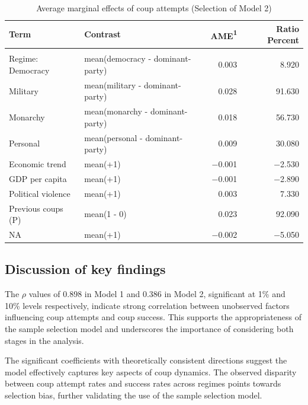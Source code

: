 \documentclass[
  12pt,
]{report}
\begin{document}
\begin{longtable}[]{@{}llrr@{}}

\caption{\label{tbl-mfx2}Average marginal effects of coup attempts
(Selection of Model 2)}

\tabularnewline

\toprule\noalign{}
Term & Contrast & AME{\textsuperscript{1}} & Ratio Percent \\
\midrule\noalign{}
\endhead
\midrule\noalign{}
\multicolumn{4}{@{}l@{}}{%
{\textsuperscript{1}} AME: Average Marginal Effect} \\
\bottomrule\noalign{}
\endlastfoot
Regime: Democracy & mean(democracy - dominant-party) & 0.003 & 8.920 \\
Military & mean(military - dominant-party) & 0.028 & 91.630 \\
Monarchy & mean(monarchy - dominant-party) & 0.018 & 56.730 \\
Personal & mean(personal - dominant-party) & 0.009 & 30.080 \\
Economic trend & mean(+1) & −0.001 & −2.530 \\
GDP per capita & mean(+1) & −0.001 & −2.890 \\
Political violence & mean(+1) & 0.003 & 7.330 \\
Previous coups (P) & mean(1 - 0) & 0.023 & 92.090 \\
NA & mean(+1) & −0.002 & −5.050 \\

\end{longtable}

\subsection{Discussion of key
findings}\label{discussion-of-key-findings}

The \(\rho\) values of 0.898 in Model 1 and 0.386 in Model 2,
significant at 1\% and 10\% levels respectively, indicate strong
correlation between unobserved factors influencing coup attempts and
coup success. This supports the appropriateness of the sample selection
model and underscores the importance of considering both stages in the
analysis.

The significant coefficients with theoretically consistent directions
suggest the model effectively captures key aspects of coup dynamics. The
observed disparity between coup attempt rates and success rates across
regimes points towards selection bias, further validating the use of the
sample selection model.
\end{document}
